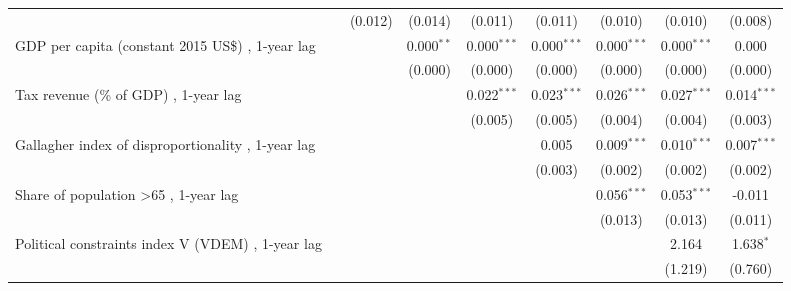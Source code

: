 \begin{table}[htbp]
\begin{tabular}{lcccccccc}
                                                                                    &               & (0.012)        & (0.014)        & (0.011)        & (0.011)        & (0.010)        & (0.010)        & (0.008)\\   
      GDP per capita (constant 2015 US\$) , 1-year lag                              &               &                & 0.000$^{**}$   & 0.000$^{***}$  & 0.000$^{***}$  & 0.000$^{***}$  & 0.000$^{***}$  & 0.000\\   
                                                                                    &               &                & (0.000)        & (0.000)        & (0.000)        & (0.000)        & (0.000)        & (0.000)\\   
      Tax revenue (\% of GDP) , 1-year lag                                          &               &                &                & 0.022$^{***}$  & 0.023$^{***}$  & 0.026$^{***}$  & 0.027$^{***}$  & 0.014$^{***}$\\   
                                                                                    &               &                &                & (0.005)        & (0.005)        & (0.004)        & (0.004)        & (0.003)\\   
      Gallagher index of disproportionality , 1-year lag                            &               &                &                &                & 0.005          & 0.009$^{***}$  & 0.010$^{***}$  & 0.007$^{***}$\\   
                                                                                    &               &                &                &                & (0.003)        & (0.002)        & (0.002)        & (0.002)\\   
      Share of population >65 , 1-year lag                                          &               &                &                &                &                & 0.056$^{***}$  & 0.053$^{***}$  & -0.011\\   
                                                                                    &               &                &                &                &                & (0.013)        & (0.013)        & (0.011)\\   
      Political constraints index V (VDEM) , 1-year lag                             &               &                &                &                &                &                & 2.164          & 1.638$^{*}$\\   
                                                                                    &               &                &                &                &                &                & (1.219)        & (0.760)\\   

\end{tabular}
\end{table}
